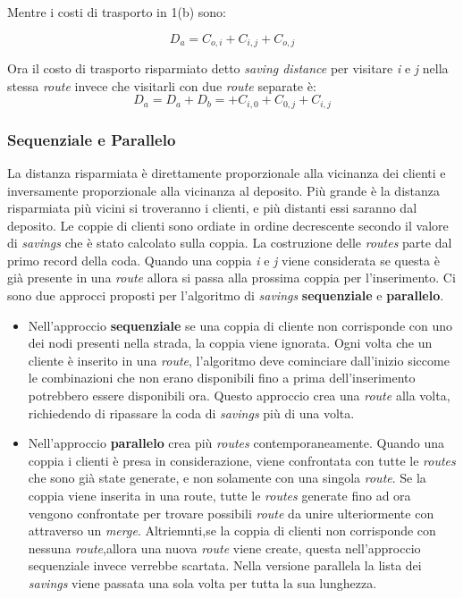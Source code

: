 \documentclass[]{article}
\begin{document}
Mentre i costi di trasporto in 1(b) sono:

\begin{equation}
D_{a} = C_{o,i} +C_{i,j} + C_{o,j} 
\end{equation}

Ora il costo di trasporto risparmiato detto \emph{saving distance} per visitare \emph{i} e \emph{j} nella stessa \emph{route} invece che visitarli con due \emph{route} separate è:
\begin{equation}
D_{a} = D_{a} +D_{b} =+ C_{i,0} +  C_{0,j} +  C_{i,j} 
\end{equation}

\subsubsection{Sequenziale e Parallelo }
La distanza risparmiata è direttamente proporzionale alla vicinanza dei clienti e inversamente proporzionale alla vicinanza al deposito.
Più grande è la distanza risparmiata più vicini si troveranno i clienti, e più distanti essi saranno dal deposito.
Le coppie di clienti sono ordiate in ordine decrescente secondo il valore di \emph{savings} che è stato calcolato sulla coppia.
La costruzione delle \emph{routes} parte dal primo record della coda. Quando una coppia \emph{i}  e \emph{j} viene considerata se questa è già presente in una \emph{route} allora si passa alla prossima coppia per l'inserimento.
Ci sono due approcci proposti per l'algoritmo di \emph{savings} \textbf{sequenziale}  e \textbf{parallelo}.
\begin{itemize}
\item Nell'approccio \textbf{sequenziale} se una coppia di cliente non corrisponde con uno dei nodi presenti nella strada, la coppia viene ignorata.
Ogni volta che un cliente è inserito in una \emph{route}, l'algoritmo deve cominciare dall'inizio siccome le combinazioni che non erano disponibili fino a prima dell'inserimento potrebbero essere disponibili ora. Questo approccio crea una \emph{route} alla volta, richiedendo di ripassare la coda di \emph{savings} più di una volta.
\item  Nell'approccio \textbf{parallelo} crea più \emph{routes} contemporaneamente. Quando una coppia i clienti è presa in considerazione, viene confrontata con tutte le \emph{routes} che sono già state generate, e non solamente con una singola \emph{route}.
Se la coppia viene inserita in una route, tutte le \emph{routes} generate fino ad ora vengono confrontate per trovare possibili \emph{route} da unire ulteriormente con attraverso un \emph{merge}.
Altriemnti,se la coppia di clienti non corrisponde con nessuna \emph{route},allora una nuova \emph{route} viene create, questa nell'approccio sequenziale invece verrebbe scartata.
Nella versione parallela la lista dei \emph{savings} viene passata una sola volta per tutta la sua lunghezza.
\end{itemize}
\end{document}
